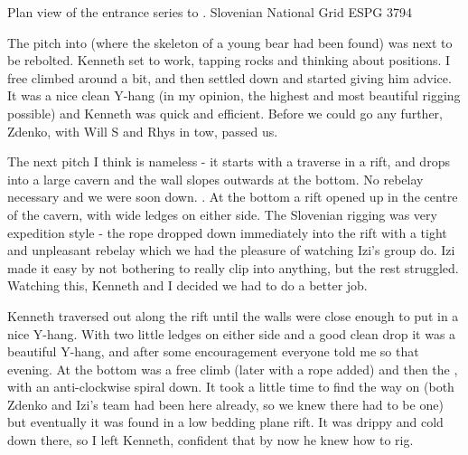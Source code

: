 \begin{marginfigure}
 \caption{Plan view of the entrance series to \protect{}. Slovenian National Grid ESPG 3794}
 \label{prim ent inset}
\end{marginfigure}

The pitch into  (where the skeleton of a young bear had been found) was next to be rebolted. Kenneth set to work, tapping rocks and thinking about positions. I free climbed around a bit, and then settled down and started giving him advice. It was a nice clean Y-hang (in my opinion, the highest and most beautiful rigging possible) and Kenneth was quick and efficient. Before we could go any further, Zdenko, with Will S and Rhys in tow, passed us.

The next pitch I think is nameless - it starts with a traverse in a rift, and drops into a large cavern and the wall slopes outwards at the bottom. No rebelay necessary and we were soon down. . At the bottom a rift opened up in the centre of the cavern, with wide ledges on either side. The Slovenian rigging was very expedition style - the rope dropped down immediately into the rift with a tight and unpleasant rebelay which we had the pleasure of watching Izi's group do. Izi made it easy by not bothering to really clip into anything, but the rest struggled. Watching this, Kenneth and I decided we had to do a better job.

Kenneth traversed out along the rift until the walls were close enough to put in a nice Y-hang. With two little ledges on either side and a good clean drop it was a beautiful Y-hang, and after some encouragement everyone told me so that evening. At the bottom was a free climb (later with a rope added) and then the , with an anti-clockwise spiral down. It took a little time to find the way on (both Zdenko and Izi's team had been here already, so we knew there had to be one) but eventually it was found in a low bedding plane rift. It was drippy and cold down there, so I left Kenneth, confident that by now he knew how to rig.

